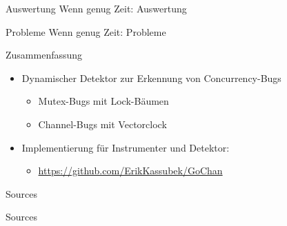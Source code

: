 \documentclass[aspectratio=169]{beamer}  %
\begin{document}
\begin{frame}{Auswertung}
  \textcolor{Red1}{Wenn genug Zeit: Auswertung}
\end{frame}

\begin{frame}{Probleme}
  \textcolor{Red1}{Wenn genug Zeit: Probleme}
\end{frame}



\begin{frame}{Zusammenfassung}
  \begin{itemize}
    \item Dynamischer Detektor zur Erkennung von Concurrency-Bugs
    \begin{itemize}
      \item Mutex-Bugs mit Lock-Bäumen
      \item Channel-Bugs mit Vectorclock
    \end{itemize}
    \item Implementierung für Instrumenter und Detektor:
    \begin{itemize}
      \item \url{https://github.com/ErikKassubek/GoChan}
    \end{itemize}
  \end{itemize}
\end{frame}






\begin{frame}{Sources}
    \nocite{*}
    \AtNextBibliography{\tiny}
    \printbibliography[heading=none, keyword={1}]
\end{frame}

\begin{frame}{Sources}
  \nocite{*}
  \AtNextBibliography{\tiny}
  \printbibliography[heading=none, keyword={2}]
\end{frame}
\end{document}

